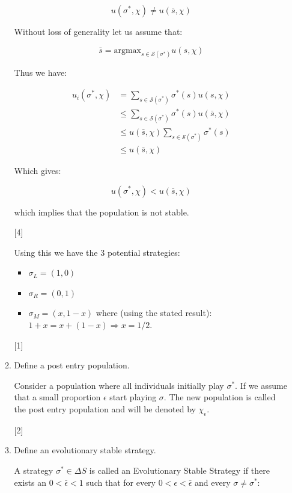 \documentclass[12pt,a4paper]{article}
\begin{document}
\begin{enumerate}
\begin{enumerate}
        $$u(\sigma^*,\chi)\ne u(\bar s,\chi)$$

        Without loss of generality let us assume that:

        $$\bar s=\text{argmax}_{s\in\mathcal{S}(\sigma^*)}u(s,\chi)$$

        Thus we have:

        $$\begin{aligned}
        u_{i}(\sigma^*,\chi)&=\sum_{s\in\mathcal{S}(\sigma^*)}\sigma^*(s)u(s,\chi)\\
        &\leq\sum_{s\in\mathcal{S}(\sigma^*)}\sigma^*(s)u(\bar s,\chi) \\
        &\leq u(\bar s,\chi)\sum_{s\in\mathcal{S}(\sigma^*)}\sigma^*(s) \\
        &\leq u(\bar s,\chi)
        \end{aligned}$$

        Which gives:

        $$u(\sigma^*,\chi)< u(\bar s,\chi)$$

        which implies that the population is not stable.

                \hfill{[4]}

        Using this we have the 3 potential strategies:

        \begin{itemize}
            \item $\sigma_L=(1,0)$
            \item $\sigma_R=(0,1)$
            \item $\sigma_M=(x,1-x)$ where (using the stated result): $1+x=x+(1-x)\Rightarrow x=1/2$.
        \end{itemize}

            \hfill[1]

            \item Define a post entry population.

                Consider a population where all individuals initially play \(\sigma^*\).
                If we assume that a small proportion \(\epsilon\) start playing \(\sigma\).
                The new population is called the post entry population and will be denoted by \(\chi_{\epsilon}\).

                \hfill{[2]}

            \item Define an evolutionary stable strategy.

                A strategy \(\sigma^*\in\Delta S\) is called an Evolutionary Stable Strategy if there exists an \(0<\bar\epsilon<1\) such that for every \(0<\epsilon<\bar \epsilon\) and every \(\sigma\ne \sigma^*\):


\end{enumerate}
\end{enumerate}
\end{document}
